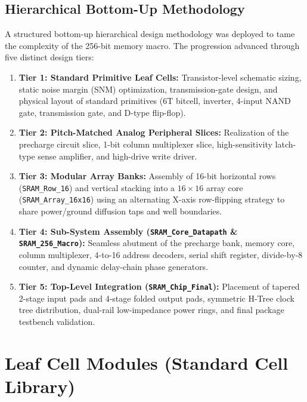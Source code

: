 \documentclass[10pt,a4paper,titlepage]{article}
\begin{document}
\subsection{Hierarchical Bottom-Up Methodology}
A structured bottom-up hierarchical design methodology was deployed to tame the complexity of the 256-bit memory macro. The progression advanced through five distinct design tiers:
\begin{enumerate}[itemsep=3pt]
    \item \textbf{Tier 1: Standard Primitive Leaf Cells:} Transistor-level schematic sizing, static noise margin (SNM) optimization, transmission-gate design, and physical layout of standard primitives (6T bitcell, inverter, 4-input NAND gate, transmission gate, and D-type flip-flop).
    \item \textbf{Tier 2: Pitch-Matched Analog Peripheral Slices:} Realization of the precharge circuit slice, 1-bit column multiplexer slice, high-sensitivity latch-type sense amplifier, and high-drive write driver.
    \item \textbf{Tier 3: Modular Array Banks:} Assembly of 16-bit horizontal rows (\texttt{SRAM\_Row\_16}) and vertical stacking into a $16\times 16$ array core (\texttt{SRAM\_Array\_16x16}) using an alternating X-axis row-flipping strategy to share power/ground diffusion taps and well boundaries.
    \item \textbf{Tier 4: Sub-System Assembly (\texttt{SRAM\_Core\_Datapath} \& \texttt{SRAM\_256\_Macro}):} Seamless abutment of the precharge bank, memory core, column multiplexer, 4-to-16 address decoders, serial shift register, divide-by-8 counter, and dynamic delay-chain phase generators.
    \item \textbf{Tier 5: Top-Level Integration (\texttt{SRAM\_Chip\_Final}):} Placement of tapered 2-stage input pads and 4-stage folded output pads, symmetric H-Tree clock tree distribution, dual-rail low-impedance power rings, and final package testbench validation.
\end{enumerate}

\newpage
\section{Leaf Cell Modules (Standard Cell Library)}
\end{document}
